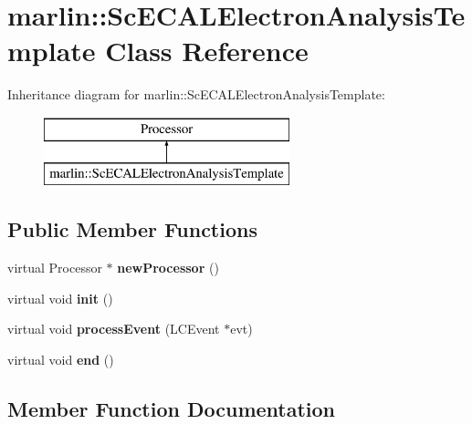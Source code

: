 \section{marlin\-:\-:Sc\-E\-C\-A\-L\-Electron\-Analysis\-Template Class Reference}
\label{classmarlin_1_1ScECALElectronAnalysisTemplate}
Inheritance diagram for marlin\-:\-:Sc\-E\-C\-A\-L\-Electron\-Analysis\-Template\-:\begin{figure}[H]
\begin{center}
\leavevmode
\includegraphics[height=2.000000cm]{classmarlin_1_1ScECALElectronAnalysisTemplate}
\end{center}
\end{figure}
\subsection*{Public Member Functions}
\begin{DoxyCompactItemize}
\item 
virtual Processor $\ast$ {\bfseries new\-Processor} ()\label{classmarlin_1_1ScECALElectronAnalysisTemplate_adc4c17bb572996cc483589511f367da2}

\item 
virtual void {\bfseries init} ()\label{classmarlin_1_1ScECALElectronAnalysisTemplate_a1c4fa55164dd262bdfeb9fd1b7a0a55b}

\item 
virtual void {\bf process\-Event} (L\-C\-Event $\ast$evt)
\item 
virtual void {\bfseries end} ()\label{classmarlin_1_1ScECALElectronAnalysisTemplate_a2165411c184cc37119c3c944ecd82744}

\end{DoxyCompactItemize}


\subsection{Member Function Documentation}
